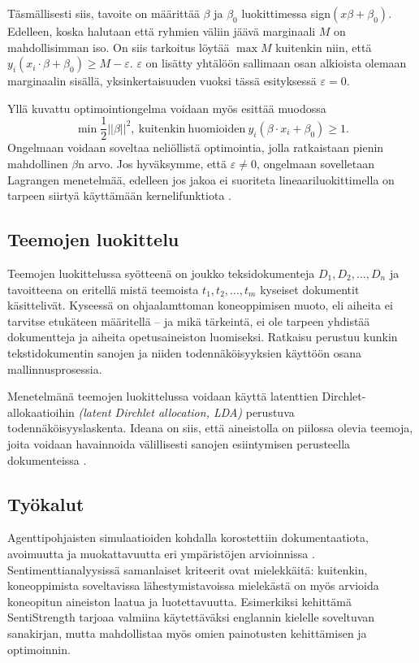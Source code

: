 \documentclass[finnish,gradu,twoside,12pt]{tktltiki}
\begin{document}
{Täsmällisesti siis, tavoite on määrittää $\beta$ ja $\beta_0$ luokittimessa sign$( x \beta + \beta_0)$. Edelleen, koska halutaan että ryhmien väliin jäävä marginaali $M$ on mahdollisimman iso. On siis tarkoitus löytää $\max M$ kuitenkin niin, että $y_i( x_i \cdot \beta + \beta_0 ) \geq M - \varepsilon$. $\varepsilon$ on lisätty yhtälöön sallimaan osan alkioista olemaan marginaalin sisällä, yksinkertaisuuden vuoksi tässä esityksessä $\varepsilon = 0$.

Yllä kuvattu optimointiongelma voidaan myös esittää muodossa $$ \min \frac{1}{2} || \beta ||^2,~\mathrm{kuitenkin~huomioiden}~y_i( \beta \cdot x_i + \beta_0 ) \geq 1.$$ Ongelmaan voidaan soveltaa neliöllistä optimointia, jolla ratkaistaan pienin mahdollinen $\beta$n arvo. Jos hyväksymme, että $\varepsilon \neq 0$, ongelmaan  sovelletaan Lagrangen menetelmää, edelleen jos jakoa ei suoriteta lineaariluokittimella on tarpeen siirtyä käyttämään kernelifunktiota \citep{vapnik1982estimation,cortes95,Hastie2009}.

\subsection{Teemojen luokittelu}

Teemojen luokittelussa syötteenä on joukko teksidokumenteja $D_1, D_2, \ldots, D_n$ ja tavoitteena on eritellä mistä teemoista $t_1, t_2, \ldots, t_m$ kyseiset dokumentit käsittelivät. Kyseessä on ohjaalamttoman koneoppimisen muoto, eli aiheita ei tarvitse etukäteen määritellä -- ja mikä tärkeintä, ei ole tarpeen yhdistää dokumentteja ja aiheita opetusaineiston luomiseksi. Ratkaisu perustuu kunkin tekstidokumentin sanojen ja niiden todennäköisyyksien käyttöön osana mallinnusprosessia.

Menetelmänä teemojen luokittelussa voidaan käyttä latenttien Dirchlet-allokaatioihin \textit{(latent Dirchlet allocation, LDA)} perustuva todennäköisyyslaskenta. Ideana on siis, että aineistolla on piilossa olevia teemoja, joita voidaan havainnoida välillisesti sanojen esiintymisen perusteella dokumenteissa \citep{Blei2010,Blei2003}.

\subsection*{Työkalut}

Agenttipohjaisten simulaatioiden kohdalla korostettiin dokumentaatiota, avoimuutta ja muokattavuutta eri ympäristöjen arvioinnissa \citep{Tobias2004}. Sentimenttianalyysissä samanlaiset kriteerit ovat mielekkäitä: kuitenkin, koneoppimista soveltavissa lähestymistavoissa mielekästä on myös arvioida koneopitun aineiston laatua ja luotettavuutta. Esimerkiksi \citet{Thelwall2010} kehittämä SentiStrength tarjoaa valmiina käytettäväksi englannin kielelle soveltuvan sanakirjan, mutta mahdollistaa myös omien painotusten kehittämisen ja optimoinnin.

}
\end{document}
